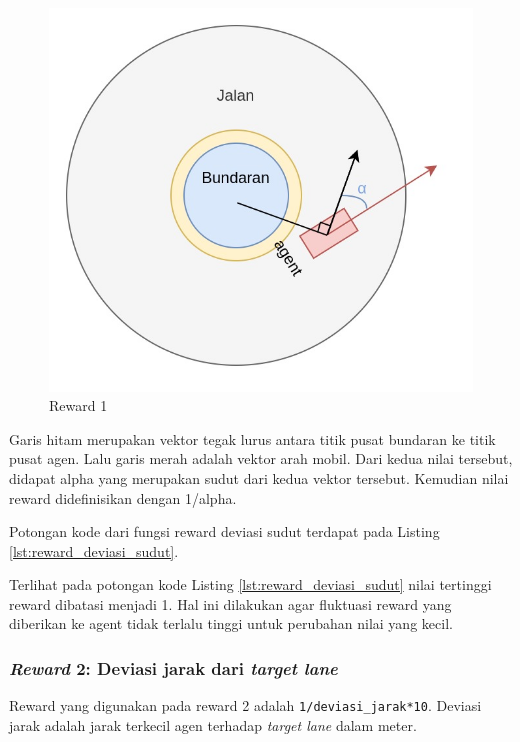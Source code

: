\begin{figure}[H] 
	\centering
	\includegraphics[width=1\linewidth]{images/reward_anglediff_sketch}
	\caption{Reward 1}
	\label{fig:reward_anglediff_sketch}
\end{figure}

Garis hitam merupakan vektor tegak lurus antara titik pusat bundaran ke titik pusat agen. Lalu garis merah adalah vektor arah mobil. Dari kedua nilai tersebut, didapat alpha yang merupakan sudut dari kedua vektor tersebut. Kemudian nilai reward didefinisikan dengan 1/alpha.

Potongan kode dari fungsi reward deviasi sudut terdapat pada Listing \ref{lst:reward_deviasi_sudut}.



Terlihat pada potongan kode Listing \ref{lst:reward_deviasi_sudut} nilai tertinggi reward dibatasi menjadi 1. Hal ini dilakukan agar fluktuasi reward yang diberikan ke agent tidak terlalu tinggi untuk perubahan nilai yang kecil.


\subsubsection{\textit{Reward} 2: Deviasi jarak dari \textit{target lane}}
Reward yang digunakan pada reward 2 adalah \verb=1/deviasi_jarak*10=. Deviasi jarak adalah jarak terkecil agen terhadap \textit{target lane} dalam meter.

